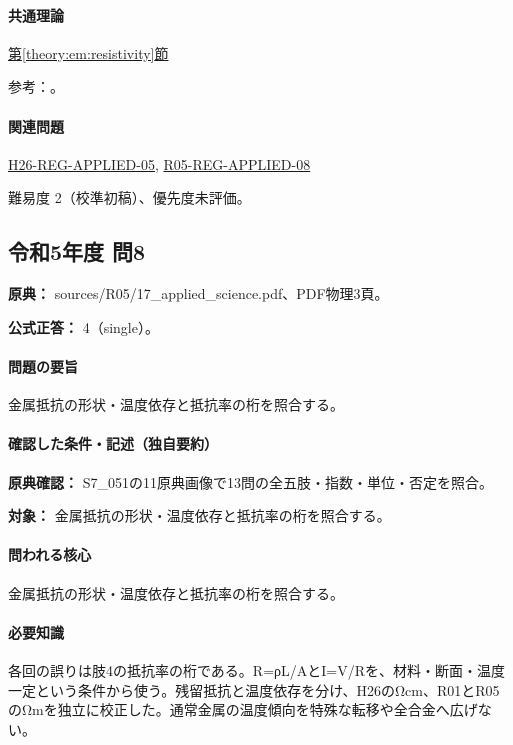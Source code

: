 \paragraph{共通理論} \hyperref[theory:em:resistivity]{第\ref*{theory:em:resistivity}節}

\par 参考：\cite{openstax_resistivity,em51_resistance}。

\paragraph{関連問題} \hyperref[q:h26-reg-applied-05]{H26-REG-APPLIED-05}, \hyperref[q:r05-reg-applied-08]{R05-REG-APPLIED-08}

\par 難易度 2（校準初稿）、優先度未評価。

\subsection{令和5年度 問8}
\label{q:r05-reg-applied-08}

\noindent\textbf{原典：} sources/R05/17\_applied\_science.pdf、PDF物理3頁。

\textbf{公式正答：} 4（single）。

\paragraph{問題の要旨} 金属抵抗の形状・温度依存と抵抗率の桁を照合する。

\paragraph{確認した条件・記述（独自要約）}\mbox{}\par

\noindent\textbf{原典確認：} S7\_051の11原典画像で13問の全五肢・指数・単位・否定を照合。\par

\noindent\textbf{対象：} 金属抵抗の形状・温度依存と抵抗率の桁を照合する。\par

\paragraph{問われる核心} 金属抵抗の形状・温度依存と抵抗率の桁を照合する。

\paragraph{必要知識} 各回の誤りは肢4の抵抗率の桁である。R=ρL/AとI=\allowbreak{}V/Rを、材料・断面・温度一定という条件から使う。残留抵抗と温度依存を分け、H26のΩcm、R01とR05のΩmを独立に校正した。通常金属の温度傾向を特殊な転移や全合金へ広げない。

